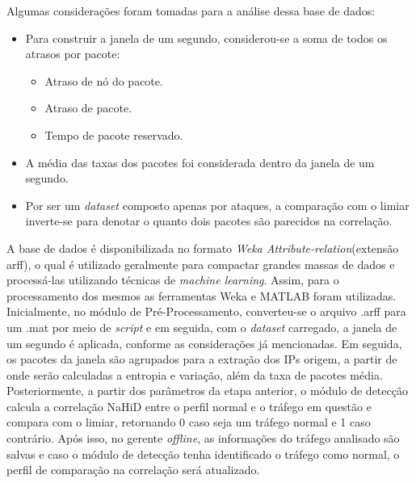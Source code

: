Algumas considerações foram tomadas para a análise dessa base de dados:
\begin{itemize}
	\item Para construir a janela de um segundo, considerou-se a soma de todos os atrasos por pacote:
	\begin{itemize}
	 \item Atraso de nó do pacote.
	 \item  Atraso de pacote.
	 \item Tempo de pacote reservado.
	\end{itemize}
	\item A média das taxas dos pacotes foi considerada dentro da janela de um segundo.
	\item Por ser um \textit{dataset} composto apenas por ataques, a comparação com o limiar inverte-se para denotar o quanto dois pacotes são parecidos na correlação.
\end{itemize}

A base de dados é disponibilizada no formato \textit{Weka Attribute-relation}(extensão arff), o qual é utilizado geralmente para compactar grandes massas de dados e processá-las utilizando técnicas de \textit{machine learning}. Assim, para o processamento dos mesmos as ferramentas Weka e MATLAB foram utilizadas. Inicialmente, no módulo de Pré-Processamento, converteu-se o arquivo .arff para um .mat por meio de \textit{script} e em seguida, com o \textit{dataset} carregado, a janela de um segundo é aplicada, conforme as considerações já mencionadas. Em seguida, os pacotes da janela são agrupados para a extração dos IPs origem, a partir de onde serão calculadas a entropia e  variação, além da taxa de pacotes média. Posteriormente, a partir dos parâmetros da etapa anterior, o módulo de detecção calcula a correlação NaHiD entre o perfil normal e o tráfego em questão e compara com o limiar, retornando 0 caso seja um tráfego normal e 1 caso contrário. Após isso, no gerente \textit{offline}, as informações do tráfego analisado são salvas e caso o módulo de detecção tenha identificado o tráfego como normal, o perfil de comparação na correlação será atualizado.